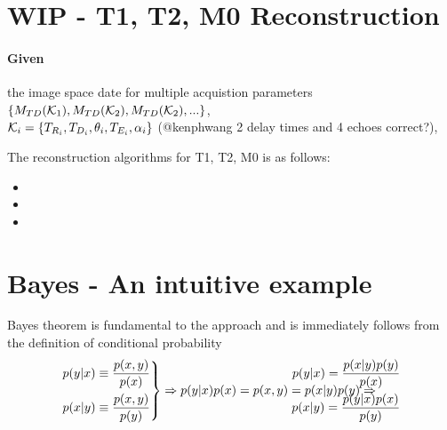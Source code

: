 \documentclass{article}         %
\theoremstyle{definition}
\theoremstyle{remark}
\begin{document}
\section{WIP - T1, T2, M0 Reconstruction}
\paragraph{Given}
the image space date for  multiple  acquistion parameters 
$\{ M_{TD}(\mathcal{K}_1),M_{TD}(\mathcal{K}_2), M_{TD}(\mathcal{K}_2),... \}$,  \\
 $\mathcal{K}_i=\{T_{R_i},T_{D_i},\theta_i,T_{E_i},\alpha_i\}$ 
{\color{red}(@kenphwang 2 delay times and 4 echoes correct?)},

The reconstruction algorithms for T1, T2, M0 is as follows:
\begin{itemize}
\item 
\item 
\item 
\end{itemize}

\nocite{*}



\appendix
\section{Bayes - An intuitive example}
Bayes theorem is fundamental to the approach and is immediately
follows from the definition of conditional probability
\[
\left.
\begin{split}
p(y|x)  \equiv  \frac{p(x,y)}{p(x)}  \\
p(x|y)  \equiv  \frac{p(x,y)}{p(y)} 
\end{split}
\right\}
\Rightarrow
p(y|x) p(x) = p(x,y) = p(x|y) p(y)
\Rightarrow
\hspace{-1in}
\begin{split}
p(y|x)  =\frac{ p(x|y) p(y) }{p(x) } \\
p(x|y)  =\frac{ p(y|x) p(x) }{p(y) } \\
\end{split}
\]
\end{document}

